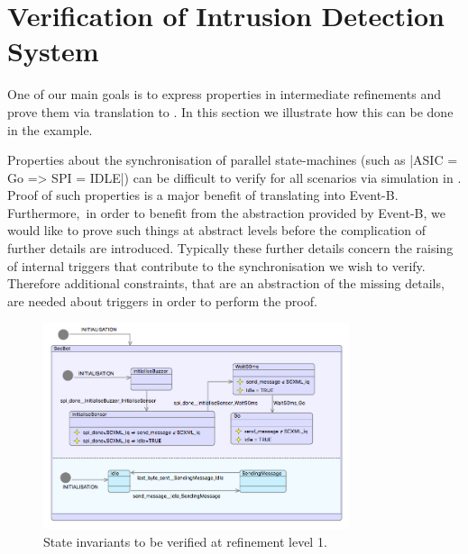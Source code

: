 
\section{Verification of Intrusion Detection System}
\label{sec:example}

One of our main goals is to express properties in \SCXML intermediate refinements and prove them via translation to \EventB.
In this section we illustrate how this can be done in the \IDS example.
 
Properties about the synchronisation of parallel state-machines (such as |ASIC = Go => SPI = IDLE|)
can be difficult to verify for all scenarios via simulation in \SCXML. 
Proof of such properties is a major benefit of translating into Event-B.  
Furthermore, in order to benefit from the abstraction provided by Event-B, we would like to prove such things at abstract levels before the complication of further details are introduced. 
Typically these further details concern the raising of internal triggers that contribute to the synchronisation we wish to verify. 
Therefore additional constraints, that are an abstraction of the missing details, are needed about triggers in order to perform the proof.

\begin{figure}[!tbp]
	\centering
	\includegraphics[width=0.8\textwidth]{figures/iumlb_verif}
	\caption{State invariants to be verified at refinement level 1.}
	\label{fig:iumlb-verif}
\end{figure}

